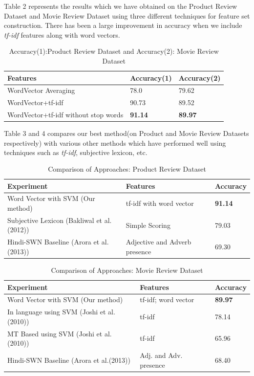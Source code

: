 \def\DevnagVersion{2.15}\documentclass[11pt]{article}
\begin{document}
Table 2 represents the results which we have obtained on the Product Review Dataset and Movie Review Dataset using three different techniques for feature set construction. There has been a large improvement in accuracy when we include \emph{tf-idf} features along with word vectors. 
\begin {table}[H]
\small
\begin{tabular}{ | p{3cm} | l | l | }
\hline
\textbf{Features} & \textbf{Accuracy(1)} & \textbf{Accuracy(2)} \\ \hline
WordVector Averaging & 78.0 & 79.62\\ \hline
WordVector+tf-idf & 90.73 & 89.52\\ \hline
WordVector+tf-idf without stop words & \textbf{91.14} & \textbf{89.97}\\ \hline
\end{tabular}
\caption {Accuracy(1):Product Review Dataset and Accuracy(2): Movie Review Dataset}
\end{table}

Table 3 and 4 compares our best method(on Product and Movie Review Datasets respectively) with various other methods which have performed well using techniques such as \emph{tf-idf}, subjective lexicon, etc.

\begin {table}[H]
\small
\begin{tabular}{ | p{3cm} | p{2.2cm} | l | }
\hline
\textbf{Experiment} & \textbf{Features} & \textbf{Accuracy} \\ \hline
Word Vector with SVM (Our method) & tf-idf with word vector & \textbf{91.14}\\ \hline
Subjective Lexicon (Bakliwal et al.(2012)) & Simple Scoring & 79.03\\ \hline
Hindi-SWN Baseline (Arora et al.(2013)) & Adjective and Adverb presence & 69.30\\ \hline
\end{tabular}
\caption {Comparison of Approaches: Product Review Dataset}
\end{table}


\begin {table}[H]
\small
\begin{tabular}{ | p{3cm} | p{2.1cm} | p{1.3cm} | }
\hline
\textbf{Experiment} & \textbf{Features} & \textbf{Accuracy} \\ \hline
Word Vector with SVM (Our method) & tf-idf; word vector & \textbf{89.97}\\ \hline
In language using SVM (Joshi et al.(2010)) & tf-idf & 78.14\\ \hline
MT Based using SVM (Joshi et al.(2010)) & tf-idf & 65.96\\ \hline
Hindi-SWN Baseline (Arora et al.(2013)) & Adj. and Adv. presence & 68.40\\ \hline
\end{tabular}
\caption {Comparison of Approaches: Movie Review Dataset}
\end{table}
\end{document}
